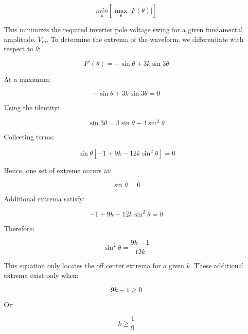 \begin{equation}
    \underset{k}{min}\left[ \underset{\theta}{\max}|F(\theta)| \right]
\end{equation}

This minimizes the required inverter pole voltage swing for a given fundamental amplitude, $V_m$. To determine the extrema of the waveform, we differentiate with respect to $\theta$:

\begin{equation}
    F'(\theta) = -\sin\theta + 3k\sin3\theta
\end{equation}

At a maximum:

\begin{equation}
    -\sin\theta + 3k\sin3\theta = 0
\end{equation}

Using the identity:

\begin{equation}
    \sin3\theta = 3\sin\theta - 4\sin^3\theta
\end{equation}

Collecting terms:

\begin{equation}
    \sin\theta[-1 + 9k -12k\sin^2\theta] = 0
\end{equation}

Hence, one set of extreme occurs at:\

\begin{equation}
    \sin\theta = 0
\end{equation}

Additional extrema satisfy:

\begin{equation}
    -1 + 9k - 12k\sin^2\theta = 0
\end{equation}

Therefore:

\begin{equation}
\label{eqn:max-locations}
    \sin^2\theta = \frac{9k - 1}{12k}
\end{equation}

This equation only locates the off center extrema for a given $k$. These additional extrema exist only when:

\begin{equation}
    9k - 1 \geq 0
\end{equation}

Or:

\begin{equation}
    k \geq \frac{1}{9}
\end{equation}

